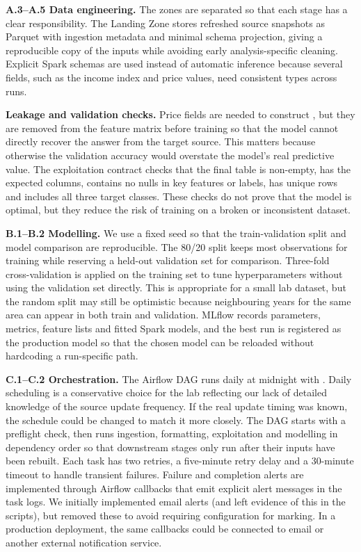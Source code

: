 \documentclass[11pt]{article}
\newcommand{\code}[1]{\texttt{\detokenize{#1}}}
\begin{document}
\textbf{A.3--A.5 Data engineering.} The zones are separated so that each stage has a clear responsibility. The Landing Zone stores refreshed source snapshots as Parquet with ingestion metadata and minimal schema projection, giving a reproducible copy of the inputs while avoiding early analysis-specific cleaning. Explicit Spark schemas are used instead of automatic inference because several fields, such as the income index and price values, need consistent types across runs. 

\textbf{Leakage and validation checks.} Price fields are needed to construct \code{price_tier}, but they are removed from the feature matrix before training so that the model cannot directly recover the answer from the target source. This matters because otherwise the validation accuracy would overstate the model's real predictive value. The exploitation contract checks that the final table is non-empty, has the expected columns, contains no nulls in key features or labels, has unique \code{(Codi_Barri, year)} rows and includes all three target classes. These checks do not prove that the model is optimal, but they reduce the risk of training on a broken or inconsistent dataset.

\textbf{B.1--B.2 Modelling.} We use a fixed seed so that the train-validation split and model comparison are reproducible. The 80/20 split keeps most observations for training while reserving a held-out validation set for comparison. Three-fold cross-validation is applied on the training set to tune hyperparameters without using the validation set directly. This is appropriate for a small lab dataset, but the random split may still be optimistic because neighbouring years for the same area can appear in both train and validation. MLflow records parameters, metrics, feature lists and fitted Spark models, and the best run is registered as the production model so that the chosen model can be reloaded without hardcoding a run-specific path.

\textbf{C.1--C.2 Orchestration.} The Airflow DAG runs daily at midnight with \code{catchup=False}. Daily scheduling is a conservative choice for the lab reflecting our lack of detailed knowledge of the source update frequency. If the real update timing was known, the schedule could be changed to match it more closely. The DAG starts with a preflight check, then runs ingestion, formatting, exploitation and modelling in dependency order so that downstream stages only run after their inputs have been rebuilt. Each task has two retries, a five-minute retry delay and a 30-minute timeout to handle transient failures. Failure and completion alerts are implemented through Airflow callbacks that emit explicit alert messages in the task logs. We initially implemented email alerts (and left evidence of this in the scripts), but removed these to avoid requiring configuration for marking. In a production deployment, the same callbacks could be connected to email or another external notification service.
\end{document}

